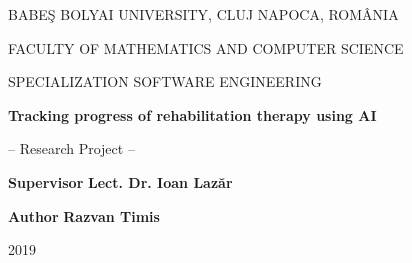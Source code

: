 \documentclass[runningheads,a4paper,11pt]{report}
\begin{document}
\begin{titlepage}
\sloppy
\begin{center}
BABE\c S BOLYAI UNIVERSITY, CLUJ NAPOCA, ROM\^ ANIA

FACULTY OF MATHEMATICS AND COMPUTER SCIENCE

SPECIALIZATION SOFTWARE ENGINEERING 

\vspace{5cm}

\Huge \textbf{Tracking progress of rehabilitation therapy using AI}

\vspace{1cm}

\normalsize -- Research Project --

\end{center}


\vspace{5cm}

\begin{flushleft}
\textbf{Supervisor} \break
\Large{\textbf{Lect. Dr. Ioan Lazăr}}
\end{flushleft}

\begin{flushright}
\textbf{Author} \break
\Large{\textbf{Razvan Timis}}
\end{flushright}

\vspace{4cm}

\begin{center}
2019
\end{center}

\end{titlepage}


\renewcommand{\contentsname}{Table of Contents}
\tableofcontents



\newpage

\end{document}
